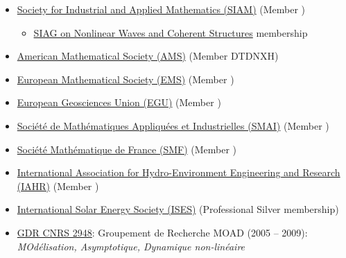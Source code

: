 \documentclass[final, a4paper, oneside, 12pt]{article}
\numberwithin{equation}{section}
\begin{document}
\begin{itemize}

  \item \href{https://www.siam.org/}{Society for Industrial and Applied Mathematics (SIAM)} (Member )
  
  \begin{itemize}
  
    \item \href{https://www.siam.org/membership/activity-groups/detail/nonlinear-waves-and-coherent-structures/}{SIAG on Nonlinear Waves and Coherent Structures} membership
  
  \end{itemize}
  
  \item \href{https://www.ams.org/}{American Mathematical Society (AMS)} (Member \No DTDNXH)
  
  \item \href{https://euromathsoc.org/}{European Mathematical Society (EMS)} (Member )

  \item \href{https://www.egu.eu/}{European Geosciences Union (EGU)} (Member )

  \item \href{https://smai.emath.fr/}{Soci\'et\'e de Math\'ematiques Appliqu\'ees et Industrielles (SMAI)} (Member )
  
  \item \href{http://smf.emath.fr}{Soci\'et\'e Math\'ematique de France (SMF)} (Member )

  \item \href{https://www.iahr.org/}{International Association for Hydro-Environment Engineering and Research (IAHR)} (Member )

  \item \href{https://www.ises.org/}{International Solar Energy Society (ISES)} (Professional Silver membership)
  
  \item \href{http://moad.univ-lyon1.fr/Main.php}{GDR CNRS 2948}: Groupement de Recherche MOAD (2005 -- 2009): \\ \textit{MOd\'elisation, Asymptotique, Dynamique non-lin\'eaire}
  
\end{itemize}

\end{document}

